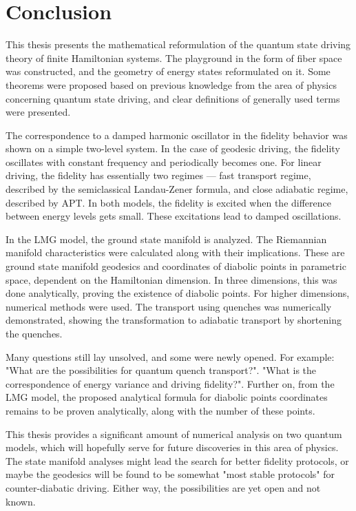 \chapter*{Conclusion}
This thesis presents the mathematical reformulation of the quantum state driving theory of finite Hamiltonian systems. The playground in the form of fiber space was constructed, and the geometry of energy states reformulated on it. Some theorems were proposed based on previous knowledge from the area of physics concerning quantum state driving, and clear definitions of generally used terms were presented.

The correspondence to a damped harmonic oscillator in the fidelity behavior was shown on a simple two-level system. In the case of geodesic driving, the fidelity oscillates with constant frequency and periodically becomes one. For linear driving, the fidelity has essentially two regimes — fast transport regime, described by the semiclassical Landau-Zener formula, and close adiabatic regime, described by APT. In both models, the fidelity is excited when the difference between energy levels gets small. These excitations lead to damped oscillations.

In the LMG model, the ground state manifold is analyzed. The Riemannian manifold characteristics were calculated along with their implications. These are ground state manifold geodesics and coordinates of diabolic points in parametric space, dependent on the Hamiltonian dimension. In three dimensions, this was done analytically, proving the existence of diabolic points. For higher dimensions, numerical methods were used. The transport using quenches was numerically demonstrated, showing the transformation to adiabatic transport by shortening the quenches.

Many questions still lay unsolved, and some were newly opened. For example: "What are the possibilities for quantum quench transport?". "What is the correspondence of energy variance and driving fidelity?". Further on, from the LMG model, the proposed analytical formula for diabolic points coordinates remains to be proven analytically, along with the number of these points.

This thesis provides a significant amount of numerical analysis on two quantum models, which will hopefully serve for future discoveries in this area of physics. The state manifold analyses might lead the search for better fidelity protocols, or maybe the geodesics will be found to be somewhat "most stable protocols" for counter-diabatic driving. Either way, the possibilities are yet open and not known.